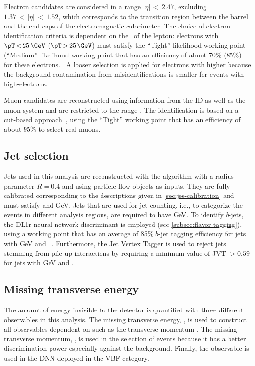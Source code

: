 Electron candidates are considered in a range $|\eta| \,{<}\, 2.47$, excluding $1.37\,{<}\,|\eta|\,{<}\,1.52$, which corresponds to the transition region between the barrel and the end-caps of the electromagnetic calorimeter.
The choice of electron identification criteria is dependent on the \pT\ of the lepton: electrons with $\pT \,{<}\,25\,\GeV$ ($\pT\,{>}\,25\,\GeV$) must satisfy the ``Tight'' likelihood working point (``Medium'' likelihood working point that has an efficiency of about 70\% (85\%) for these electrons.~\cite{EGAM-2018-01}
A looser selection is applied for electrons with higher \pT because the background contamination from misidentifications is smaller for events with high-\pT electrons.

Muon candidates are reconstructed using information from the ID as well as the muon system and are restricted to the range .
The identification is based on a cut-based approach~\cite{MUON-2018-03}, using the ``Tight'' working point that has an efficiency of about 95\% to select real muons.

\subsection{Jet selection}
Jets used in this analysis are reconstructed with the \antikt algorithm with a radius parameter $R = 0.4$ and using particle flow objects as inputs.
They are fully calibrated corresponding to the descriptions given in \cref{sec:jes-calibration} and must satisfy  and GeV.
Jets that are used for jet counting, i.e., to categorize the events in different analysis regions, are required to have GeV.
To identify $b$-jets, the DL1r neural network discriminant is employed (see \cref{subsec:flavor-tagging}), using a working point that has an average of 85\% $b$-jet tagging efficiency for jets with GeV and ~\cite{FTAG-2018-01}.
Furthermore, the Jet Vertex Tagger is used to reject jets stemming from pile-up interactions by requiring a minimum value of JVT $> 0.59$ for jets with GeV and .

\subsection{Missing transverse energy}
The amount of energy invisible to the detector is quantified with three different observables in this analysis.
The missing transverse energy, \ETmiss, is used to construct all observables dependent on \ETmiss such as the transverse momentum \mT.
The missing transverse momentum, \pTmiss, is used in the selection of events because it has a better discrimination power especially against the \Zgamma background.
Finally, the \METSig observable is used in the DNN deployed in the VBF category.

